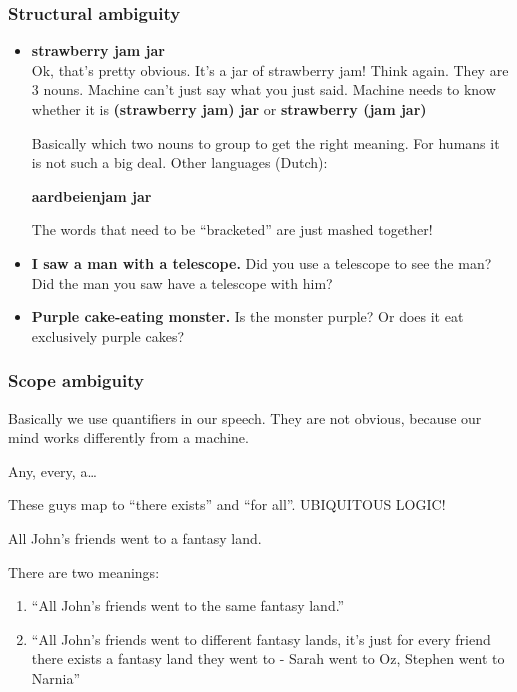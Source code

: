 \subsubsection{Structural ambiguity}

\begin{itemize}
	\item \textbf{strawberry jam jar}\\ 
	Ok, that's pretty obvious. It's a jar of strawberry jam! Think again. They 
	are 3 nouns. Machine can't just say what you just said. Machine needs to 
	know whether it is \textbf{(strawberry jam) jar} or \textbf{strawberry (jam 
	jar)}

	Basically which two nouns to group to get the right meaning. For humans it 
	is not such a big deal. Other languages (Dutch):

	\textbf{aardbeienjam jar}

	The words that need to be ``bracketed'' are just mashed together!

	\item \textbf{I saw a man with a telescope.} Did you use a telescope to see 
	the man? Did the man you saw have a telescope with him?
	\item \textbf{Purple cake-eating monster.} Is the monster purple? Or does it
	 eat exclusively purple cakes?
\end{itemize}


\subsubsection{Scope ambiguity}


Basically we use quantifiers in our speech. They are not obvious, because our
mind works differently from a machine.

Any, every, a\ldots

These guys map to ``there exists'' and ``for all''. UBIQUITOUS LOGIC!

All John's friends went to a fantasy land.

There are two meanings:

\begin{enumerate}
	\item ``All John's friends went to the same fantasy land.''
	\item ``All John's friends went to different fantasy lands, it's just for 
	every friend there exists a fantasy land they went to - Sarah went to Oz, 
	Stephen went to Narnia''
\end{enumerate}

